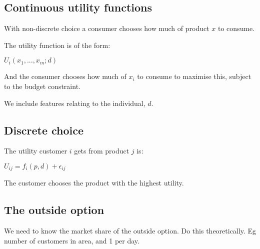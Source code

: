 
\subsection{Continuous utility functions}

With non-discrete choice a consumer chooses how much of product \(x\) to consume.

The utility function is of the form:

\(U_i(x_1,...,x_m;d)\)

And the consumer chooses how much of \(x_i\) to consume to maximise this, subject to the budget constraint.

We include features relating to the individual, \(d\).

\subsection{Discrete choice}

The utility customer \(i\) gets from product \(j\) is:

\(U_{ij}=f_i(p,d)+\epsilon_{ij}\)

The customer chooses the product with the highest utility.

\subsection{The outside option}

We need to know the market share of the outside option. Do this theoretically. Eg number of customers in area, and 1 per day.

